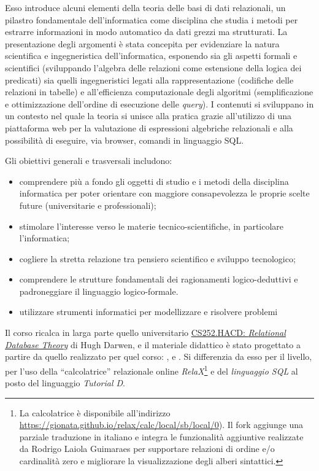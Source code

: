 \documentclass[withtimes]{easychair}
\theoremstyle{definition}
\begin{document}
Esso introduce alcuni elementi della teoria delle basi di dati relazionali, un pilastro fondamentale dell'informatica come disciplina che studia i metodi per estrarre informazioni in modo automatico da dati grezzi ma strutturati. La presentazione degli argomenti è stata concepita per evidenziare la natura scientifica e ingegneristica dell'informatica,  esponendo sia gli aspetti formali e scientifici (sviluppando l'algebra delle relazioni come estensione della logica dei predicati) sia quelli ingegneristici legati alla rappresentazione (codifiche delle relazioni in tabelle) e all'efficienza computazionale degli algoritmi (semplificazione e ottimizzazione dell'ordine di esecuzione delle \emph{query}). I contenuti si sviluppano in un contesto nel quale la teoria si unisce alla pratica grazie all'utilizzo di una piattaforma web per la valutazione di espressioni algebriche relazionali e alla possibilità di eseguire, via browser, comandi in linguaggio SQL.

Gli obiettivi generali e trasversali includono:

\begin{itemize}
 \item comprendere più a fondo gli oggetti di studio e i metodi della disciplina informatica per poter orientare con maggiore consapevolezza le proprie scelte future (universitarie e professionali);
 \item stimolare l'interesse verso le materie tecnico-scientifiche, in particolare l'informatica;
 \item cogliere la stretta relazione tra pensiero scientifico e sviluppo tecnologico;
 \item comprendere le strutture fondamentali dei ragionamenti logico-deduttivi
e padroneggiare il linguaggio logico-formale.
 \item utilizzare strumenti informatici per modellizzare e risolvere problemi
\end{itemize}

Il corso ricalca in larga parte quello universitario \href{https://www.dcs.warwick.ac.uk/~hugh/#CS252}{CS252.HACD:
\emph{Relational Database Theory}} di Hugh Darwen, e il  materiale didattico è stato progettato a partire da quello realizzato per quel corso: \cite{darwen2014introduction}, \cite{darwen2010exercises} e \cite{darwen2011sql}. Si differenzia da esso per il livello, per l'uso della ``calcolatrice'' relazionale online \emph{RelaX}\footnote{La calcolatrice è disponibile all'indirizzo
\url{https://gionata.github.io/relax/calc/local/sb/local/0}). Il fork aggiunge una parziale traduzione in italiano e integra le funzionalità aggiuntive realizzate da Rodrigo Laiola Guimaraes per supportare relazioni di ordine e/o cardinalità zero e migliorare la visualizzazione degli alberi sintattici.} e del \emph{linguaggio SQL} al posto del linguaggio \emph{Tutorial D}.
\end{document}
